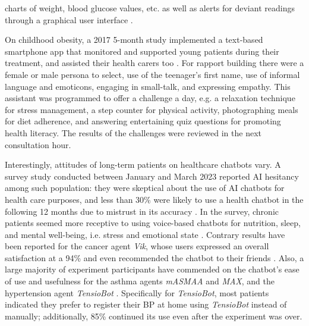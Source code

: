 charts of weight, blood glucose values, etc. as well as alerts for deviant readings through a graphical user interface \cite{17thIEEESymposium2004}.

On childhood obesity, a 2017 5-month study implemented a text-based smartphone app that monitored and supported young patients during their treatment, and assisted their health carers too \cite{childhoodobesity2017}. For rapport building there were a female or male persona to select, use of the teenager's first name, use of informal language and emoticons, engaging in small-talk, and expressing empathy. This assistant was programmed to offer a challenge a day, e.g. a relaxation technique for stress management, a step counter for physical activity, photographing meals for diet adherence, and answering entertaining quiz questions for promoting health literacy. The results of the challenges were reviewed in the next consultation hour.

Interestingly, attitudes of long-term patients on healthcare chatbots vary. A survey study conducted between January and March 2023 reported AI hesitancy among such population: they were skeptical about the use of AI chatbots for health care purposes, and less than 30\% were likely to use a health chatbot in the following 12 months due to mistrust in its accuracy \cite{aihesitancy2024}. In the survey, chronic patients seemed more receptive to using voice-based chatbots for nutrition, sleep, and mental well-being, i.e. stress and emotional state \cite{aihesitancy2024}. Contrary results have been reported for the cancer agent \textit{Vik}, whose users expressed an overall satisfaction at a 94\% and even recommended the chatbot to their friends \cite{vik2019}. Also, a large majority of experiment participants have commended on the chatbot's ease of use and usefulness for the asthma agents \textit{mASMAA}  and \textit{MAX}, and the hypertension agent \textit{TensioBot} \cite{asthma2014, max2021, selma2020}. Specifically for \textit{TensioBot}, most patients indicated they prefer to register their BP at home using \textit{TensioBot} instead of manually; additionally, 85\% continued its use even after the experiment was over. 


